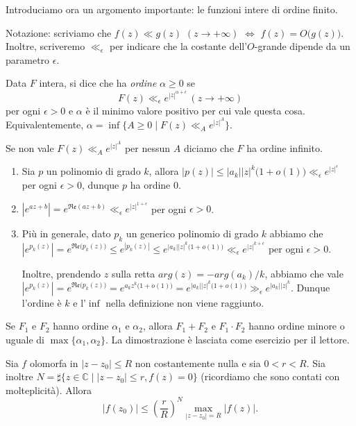 Introduciamo ora un argomento importante: le funzioni intere di ordine finito.

Notazione: scriviamo che $f(z) \ll g(z)$ $(z \longrightarrow +\infty)$ $\iff$ $f(z)=O\big(g(z)\big)$. Inoltre, scriveremo $\ll_{\epsilon}$ per indicare che la costante dell'$O$-grande dipende da un parametro $\epsilon$.

\begin{defn}
  Data $F$ intera, si dice che ha \textit{ordine} $\alpha \ge 0$ se
  $$F(z) \ll_{\epsilon} e^{|z|^{\alpha+\epsilon}} \, (z \longrightarrow +\infty)$$
  per ogni $\epsilon>0$ e $\alpha$ è il minimo valore positivo per cui vale questa cosa. Equivalentemente, $\alpha=\inf\{A \ge 0 \mid F(z) \ll_A e^{|z|^A}\}$.

  Se non vale $F(z) \ll_A e^{|z|^A}$ per nessun $A$ diciamo che $F$ ha ordine infinito.
\end{defn}

\begin{ex}
  \begin{enumerate}
    \item Sia $p$ un polinomio di grado $k$, allora $|p(z)| \le |a_k||z|^k\big(1+o(1)\big) \ll_{\epsilon} e^{|z|^{\epsilon}}$ per ogni $\epsilon>0$, dunque $p$ ha ordine $0$.
    \item $|e^{az+b}|=e^{\mathfrak{Re}(az+b)} \ll_{\epsilon} e^{|z|^{1+\epsilon}}$ per ogni $\epsilon>0$.
    \item Più in generale, dato $p_k$ un generico polinomio di grado $k$ abbiamo che $|e^{p_k(z)}|=e^{\mathfrak{Re}\big(p_k(z)\big)} \le e^{|p_k(z)|} \le e^{|a_k||z|^k\big(1+o(1)\big)} \ll_{\epsilon} e^{|z|^{k+\epsilon}}$ per ogni $\epsilon>0$.

    Inoltre, prendendo $z$ sulla retta $arg(z)=-arg(a_k)/k$, abbiamo che vale $|e^{p_k(z)}|=e^{\mathfrak{Re}\big(p_k(z)\big)}=e^{a_kz^k\big(1+o(1)\big)}=e^{|a_k||z|^k\big(1+o(1)\big)} \gg_{\epsilon} e^{|a_k||z|^k}$. Dunque l'ordine è $k$ e l'$\inf$ nella definizione non viene raggiunto.
  \end{enumerate}
\end{ex}

\begin{oss}
  Se $F_1$ e $F_2$ hanno ordine $\alpha_1$ e $\alpha_2$, allora $F_1+F_2$ e $F_1 \cdot F_2$ hanno ordine minore o uguale di $\max\{\alpha_1,\alpha_2\}$. La dimostrazione è lasciata come esercizio per il lettore.
\end{oss}

\begin{lm} \label{1.2.4}
  Sia $f$ olomorfa in $|z-z_0| \le R$ non costantemente nulla e sia $0<r<R$. Sia inoltre $N=\sharp\{z \in \mathbb{C} \mid |z-z_0| \le r, f(z)=0\}$ (ricordiamo che sono contati con molteplicità). Allora
  $$|f(z_0)| \le \left(\frac{r}{R}\right)^N\max_{|z-z_0|=R}|f(z)|.$$
\end{lm}


